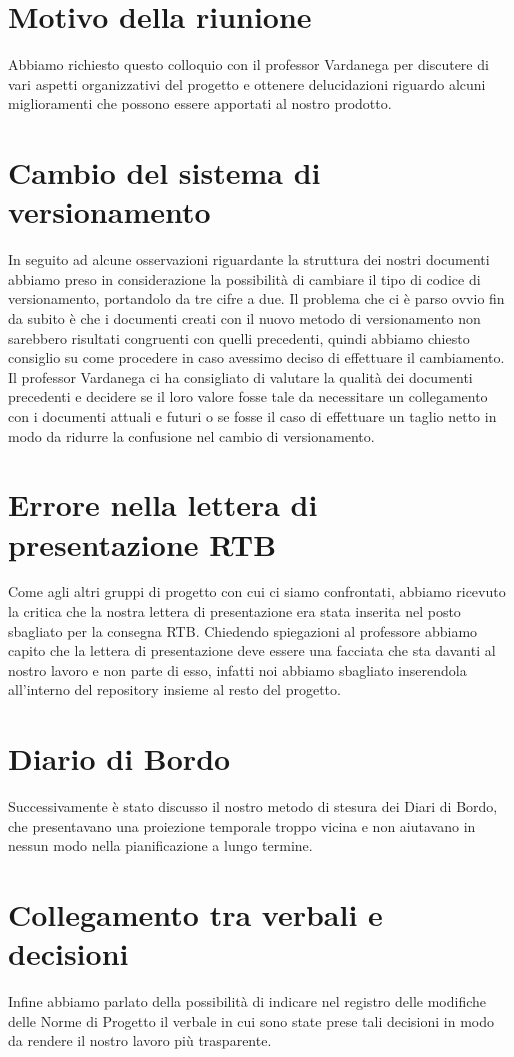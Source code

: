 \section{Motivo della riunione}
Abbiamo richiesto questo colloquio con il professor Vardanega per discutere di vari aspetti organizzativi del progetto e ottenere delucidazioni riguardo alcuni miglioramenti che possono essere apportati al nostro prodotto.

\section{Cambio del sistema di versionamento}
In seguito ad alcune osservazioni riguardante la struttura dei nostri documenti abbiamo preso in considerazione la possibilità di cambiare il tipo di codice di versionamento, portandolo da tre cifre a due. \tabularnewline
Il problema che ci è parso ovvio fin da subito è che i documenti creati con il nuovo metodo di versionamento non sarebbero risultati congruenti con quelli precedenti, quindi abbiamo chiesto consiglio su come procedere in caso avessimo deciso di effettuare il cambiamento. \tabularnewline
Il professor Vardanega ci ha consigliato di valutare la qualità dei documenti precedenti e decidere se il loro valore fosse tale da necessitare un collegamento con i documenti attuali e futuri o se fosse il caso di effettuare un taglio netto in modo da ridurre la confusione nel cambio di versionamento.

\section{Errore nella lettera di presentazione RTB}
Come agli altri gruppi di progetto con cui ci siamo confrontati, abbiamo ricevuto la critica che la nostra lettera di presentazione era stata inserita nel posto sbagliato per la consegna RTB. \tabularnewline
Chiedendo spiegazioni al professore abbiamo capito che la lettera di presentazione deve essere una facciata che sta davanti al nostro lavoro e non parte di esso, infatti noi abbiamo sbagliato inserendola all'interno del repository insieme al resto del progetto.

\section{Diario di Bordo}
Successivamente è stato discusso il nostro metodo di stesura dei Diari di Bordo, che presentavano una proiezione temporale troppo vicina e non aiutavano in nessun modo nella pianificazione a lungo termine.

\section{Collegamento tra verbali e decisioni}
Infine abbiamo parlato della possibilità di indicare nel registro delle modifiche delle Norme di Progetto il verbale in cui sono state prese tali decisioni in modo da rendere il nostro lavoro più trasparente.
